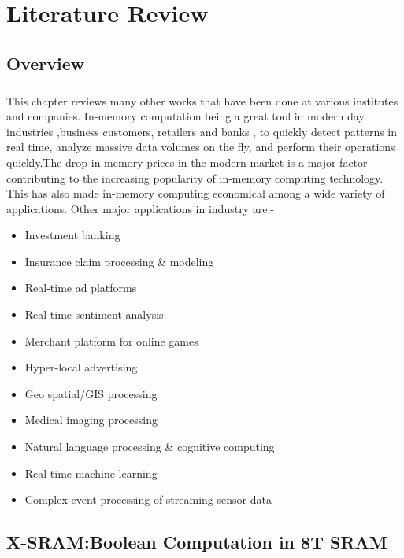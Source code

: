 %
%
\let\textcircled=\pgftextcircled
\chapter{Literature Review}
\label{chap:Literature_Review}

\section{Overview}
\paragraph{}

This chapter reviews many other works that have been done at various institutes and companies. In-memory computation being a great tool in modern day industries ,business customers, retailers and banks , to quickly detect patterns in real time, analyze massive data volumes on the fly, and perform their operations quickly.The drop in memory prices in the modern market is a major factor contributing to the increasing popularity of in-memory computing technology. This has also made in-memory computing economical among a wide variety of applications. Other major applications in industry
are:-
\begin{itemize}
\item Investment banking 
\item Insurance claim processing \& modeling 
\item Real-time ad platforms 
\item Real-time sentiment analysis 
\item Merchant platform for online games 
\item Hyper-local advertising 
\item Geo spatial/GIS processing 
\item Medical imaging processing 
\item Natural language processing \& cognitive computing 
\item Real-time machine learning 
\item Complex event processing of streaming sensor data 
\end{itemize}

\section{X-SRAM:Boolean Computation in 8T SRAM}
\paragraph{}

